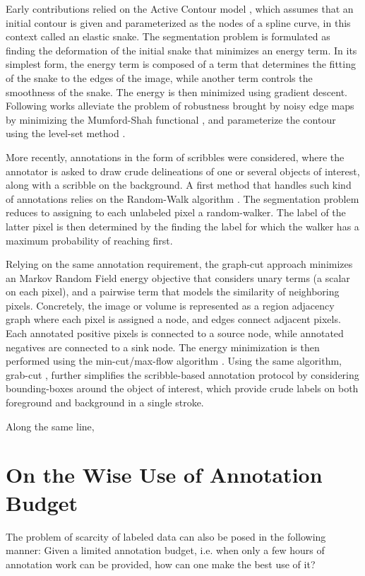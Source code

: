 Early contributions relied on the Active Contour model \cite{kass88}, which assumes that an initial contour is given and parameterized as the nodes of a spline curve, in this context called an elastic snake.
The segmentation problem is formulated as finding the deformation of the initial snake that minimizes an energy term.
In its simplest form, the energy term is composed of a term that determines the fitting of the snake to the edges of the image, while another term controls the smoothness of the snake.
The energy is then minimized using gradient descent.
Following works alleviate the problem of robustness brought by noisy edge maps by minimizing the Mumford-Shah functional \cite{chan01}, and parameterize the contour using the level-set method \cite{osher88}.

More recently, annotations in the form of scribbles were considered, where the annotator is asked to draw crude delineations of one or several objects of interest, along with a scribble on the background.
A first method that handles such kind of annotations relies on the Random-Walk algorithm \cite{grady06}.
The segmentation problem reduces to assigning to each unlabeled pixel a random-walker. The label of the latter pixel is then determined by the finding the label for which the walker has a maximum probability of reaching first.

Relying on the same annotation requirement, the graph-cut approach \cite{Boykov2006}
minimizes an Markov Random Field energy objective that considers unary terms (a scalar on each pixel), and a pairwise term that models the similarity of neighboring pixels.
Concretely, the image or volume is represented as a region adjacency graph where each pixel is assigned a node, and edges connect adjacent pixels.
Each annotated positive pixels is connected to a source node, while annotated negatives are connected to a sink node.
The energy minimization is then performed using the min-cut/max-flow algorithm \cite{goldberg88}.
Using the same algorithm, grab-cut \cite{rother04}, further simplifies the scribble-based annotation protocol by considering bounding-boxes around the object of interest, which provide crude labels on both foreground and background in a single stroke.

Along the same line, \cite{criminisi08}

\section{On the Wise Use of Annotation Budget}
The problem of scarcity of labeled data can also be posed in the following manner:
Given a limited annotation budget, i.e. when only a few hours of annotation work can be provided, how can one make the best use of it?

